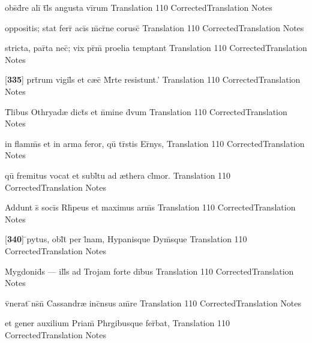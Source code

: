 \latline
  {obs\={}d\={}re ali\={\macron {\i}} t\={}l\={\macron {\i}}s angusta vi\={}rum}
  { Translation }
  {110}
  { CorrectedTranslation }
  { Notes }


\latline
  {oppositis; stat ferr\={\macron {\i}} aci\={}s m\={}cr\={}ne corusc\={}}
  { Translation }
  {110}
  { CorrectedTranslation }
  { Notes }


\latline
  {stricta, par\={}ta nec\={\macron {\i}}; vix pr\={\macron {\i}}m\={\macron {\i}} proelia temptant}
  { Translation }
  {110}
  { CorrectedTranslation }
  { Notes }


\latline
  {[\textbf{335}] prt\={}rum vigil\={}s et c{\ae}c\={} M\={}rte resistunt.'}
  { Translation }
  {110}
  { CorrectedTranslation }
  { Notes }


\latline
  {T\={}libus Othryad{\ae} dict\={\macron {\i}}s et n\={}mine d\={\macron {\i}}vum}
  { Translation }
  {110}
  { CorrectedTranslation }
  { Notes }


\latline
  {in flamm\={}s et in arma feror, qu\={} tr\={\macron {\i}}stis Er\={\macron {\i}}nys,}
  { Translation }
  {110}
  { CorrectedTranslation }
  { Notes }


\latline
  {qu\={} fremitus vocat et subl\={}tu ad {\ae}thera cl\={}mor.}
  { Translation }
  {110}
  { CorrectedTranslation }
  { Notes }


\latline
  {Addunt s\={} soci\={}s Rh\={\macron {\i}}peus et maximus arm\={\macron {\i}}s}
  { Translation }
  {110}
  { CorrectedTranslation }
  { Notes }


\latline
  {[\textbf{340}] \={}pytus, obl\={}t\={\macron {\i}} per l\={}nam, Hypanisque Dym\={}sque}
  { Translation }
  {110}
  { CorrectedTranslation }
  { Notes }


\latline
  {Mygdonid\={}s --- ill\={\macron {\i}}s ad Trojam forte di\={}bus}
  { Translation }
  {110}
  { CorrectedTranslation }
  { Notes }


\latline
  {v\={}nerat \={\macron {\i}}ns\={}n\={} Cassandr{\ae} inc\={}nsus am\={}re}
  { Translation }
  {110}
  { CorrectedTranslation }
  { Notes }


\latline
  {et gener auxilium Priam\={} Phrgibusque fer\={}bat,}
  { Translation }
  {110}
  { CorrectedTranslation }
  { Notes }


